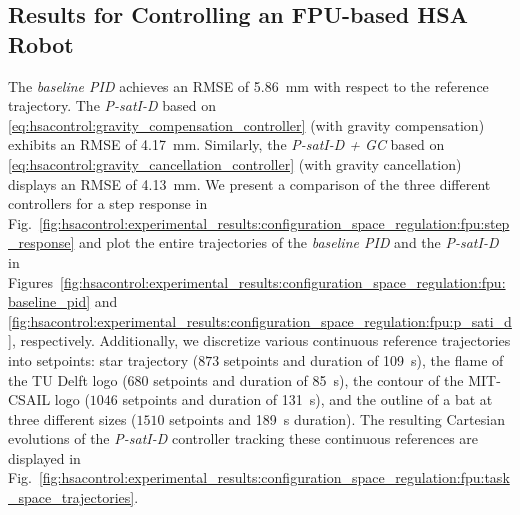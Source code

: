 \subsection{Results for Controlling an FPU-based HSA Robot}
The \emph{baseline PID} achieves an \gls{RMSE} of \SI{5.86}{mm} with respect to the reference trajectory. The \emph{P-satI-D} based on \eqref{eq:hsacontrol:gravity_compensation_controller} (with gravity compensation) exhibits an RMSE of \SI{4.17}{mm}. Similarly, the \emph{P-satI-D + GC} based on \eqref{eq:hsacontrol:gravity_cancellation_controller} (with gravity cancellation) displays an RMSE of \SI{4.13}{mm}.
We present a comparison of the three different controllers for a step response in Fig.~\ref{fig:hsacontrol:experimental_results:configuration_space_regulation:fpu:step_response} and plot the entire trajectories of the \emph{baseline PID} and the \emph{P-satI-D} in Figures~\ref{fig:hsacontrol:experimental_results:configuration_space_regulation:fpu:baseline_pid} and \ref{fig:hsacontrol:experimental_results:configuration_space_regulation:fpu:p_sati_d}, respectively.
Additionally, we discretize various continuous reference trajectories into setpoints: 
star trajectory ($873$ setpoints and duration of \SI{109}{s}), the flame of the TU Delft logo ($680$ setpoints and duration of \SI{85}{s}), the contour of the MIT-CSAIL logo ($1046$ setpoints and duration of \SI{131}{s}), and the outline of a bat at three different sizes ($1510$ setpoints and \SI{189}{s} duration).
The resulting Cartesian evolutions of the \emph{P-satI-D} controller tracking these continuous references are displayed in Fig.~\ref{fig:hsacontrol:experimental_results:configuration_space_regulation:fpu:task_space_trajectories}.

